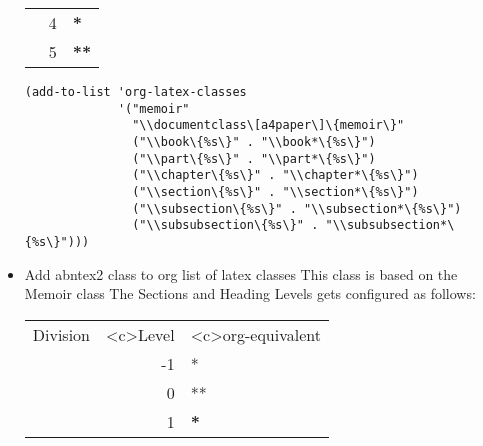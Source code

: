 \documentclass[11pt]{article}
\begin{document}
\begin{itemize}
\begin{center}
\begin{tabular}{lrl}
\paragraph & 4 & \textbf{\textbf{\textbf{*}}}\\
\subparagraph & 5 & \textbf{\textbf{\textbf{**}}}\\
\end{tabular}
\end{center}


\begin{verbatim}
(add-to-list 'org-latex-classes
             '("memoir"
               "\\documentclass\[a4paper\]\{memoir\}"
               ("\\book\{%s\}" . "\\book*\{%s\}")
               ("\\part\{%s\}" . "\\part*\{%s\}")
               ("\\chapter\{%s\}" . "\\chapter*\{%s\}")
               ("\\section\{%s\}" . "\\section*\{%s\}")
               ("\\subsection\{%s\}" . "\\subsection*\{%s\}")
               ("\\subsubsection\{%s\}" . "\\subsubsection*\{%s\}")))
\end{verbatim}

\item Add abntex2 class to org list of latex classes
\label{sec:org16a178e}
This class is based on the Memoir class
The Sections and Heading Levels gets configured as follows: 

\begin{center}
\begin{tabular}{lrl}
Division & <c>Level & <c>org-equivalent\\
\part & -1 & *\\
\chapter & 0 & **\\
\section & 1 & \textbf{*}\\

\end{tabular}
\end{center}
\end{itemize}
\end{document}

